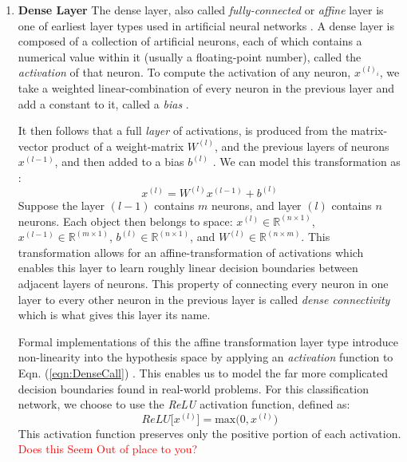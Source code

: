 \documentclass[conference,onecolumn,letterpaper]{IEEEtran}
\begin{document}
\begin{enumerate}

\item\textbf{Dense Layer}
The dense layer, also called \textit{fully-connected} or \textit{affine} layer is one of earliest layer types used in artificial neural networks \cite{Geron,Loy}. A dense layer is composed of a collection of artificial neurons, each of which contains a numerical value within it (usually a floating-point number), called the \textit{activation} of that neuron. To compute the activation of any neuron, $x^{(l)_{i}}$, we take a weighted linear-combination of every neuron in the previous layer and add a constant to it, called a \textit{bias} \cite{Geron,Goodfellow,Loy}. 

It then follows that a full \textit{layer} of activations, is produced from the matrix-vector product of a weight-matrix $W^{(l)}$, and the previous layers of neurons $x^{(l-1)}$, and then added to a bias $b^{(l)}$ \cite{Goodfellow,Tensorflow}. We can model this transformation as :
\begin{equation}
\label{eqn:DenseCall}
x^{(l)} = W^{(l)}x^{(l-1)} + b^{(l)}
\end{equation}
Suppose the layer $(l-1)$ contains $m$ neurons, and layer $(l)$ contains $n$ neurons. Each object then belongs to space: $x^{(l)} \in \mathbb{R}^(n \times 1)$, $x^{(l-1)} \in \mathbb{R}^(m \times 1)$, $b^{(l)} \in \mathbb{R}^(n \times 1)$, and $W^{(l)} \in \mathbb{R}^(n \times m)$. This transformation allows for an affine-transformation of activations which enables this layer to learn roughly linear decision boundaries between adjacent layers of neurons. This property of connecting every neuron in one layer to every other neuron in the previous layer is called \textit{dense connectivity} which is what gives this layer its name.

Formal implementations of this the affine transformation layer type introduce non-linearity into the hypothesis space by applying an \textit{activation} function to Eqn. (\ref{eqn:DenseCall}) \cite{Goodfellow}. This enables us to model the far more complicated decision boundaries found in real-world problems. For this classification network, we choose to use the \textit{ReLU} activation function, defined as:
\begin{equation}
\label{eqn:ReLU}
ReLU \big[ x^{(l)} \big] = \text{max} \big( 0, x^{(l)} \big)
\end{equation} 
This activation function preserves only the positive portion of each activation. \textcolor{red}{Does this Seem Out of place to you?}


\end{enumerate}
\end{document}
